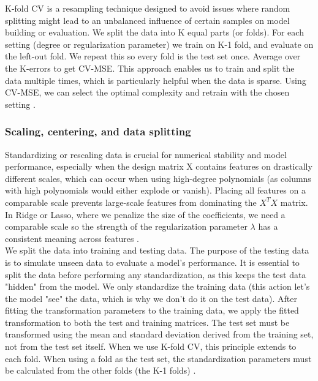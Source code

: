 \documentclass[amssymb,twocolumn,aps,floatfix]{revtex4-2}
\begin{document}
K-fold CV is a resampling technique designed to avoid issues where random splitting might lead to an unbalanced influence of certain samples on model building or evaluation. We split the data into K equal parts (or folds). For each setting (degree or regularization parameter) we train on K-1 fold, and evaluate on the left-out fold. We repeat this so every fold is the test set once. Average over the K-errors to get CV-MSE. This approach enables us to train and split the data multiple times, which is particularly helpful when the data is sparse. Using CV-MSE, we can select the optimal complexity and retrain with the chosen setting \cite{compfys39}.   

\subsubsection{Scaling, centering, and data splitting}
\label{subsubsec:scal_theory}

Standardizing or rescaling data is crucial for numerical stability and model performance, especially when the design matrix X contains features on drastically different scales, which can occur when using high-degree polynomials (as columns with high polynomials would either explode or vanish). Placing all features on a comparable scale prevents large-scale features from dominating the $X^TX$ matrix. In Ridge or Lasso, where we penalize the size of the coefficients, we need a comparable scale so the strength of the regularization parameter $\lambda$ has a consistent meaning across features \cite{hjorthjensen_week35_misc}. \\

We split the data into training and testing data. The purpose of the testing data is to simulate unseen data to evaluate a model's performance. It is essential to split the data before performing any standardization, as this keeps the test data "hidden" from the model. We only standardize the training data (this action let's the model "see" the data, which is why we don't do it on the test data). After fitting the transformation parameters to the training data, we apply the fitted transformation to both the test and training matrices. The test set must be transformed using the mean and standard deviation derived from the training set, not from the test set itself. When we use K-fold CV, this principle extends to each fold. When using a fold as the test set, the standardization parameters must be calculated from the other folds (the K-1 folds) \cite{compfys39}. 
\end{document}
